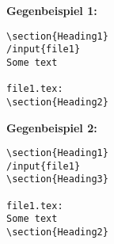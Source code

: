 \begin{itemize}
  \textbf{Gegenbeispiel 1:}
  \begin{verbatim}
\section{Heading1}
/input{file1}
Some text

file1.tex:
\section{Heading2}
  \end{verbatim}

  \textbf{Gegenbeispiel 2:}
  \begin{verbatim}
\section{Heading1}
/input{file1}
\section{Heading3}

file1.tex:
Some text
\section{Heading2}
  \end{verbatim}
\end{itemize}
